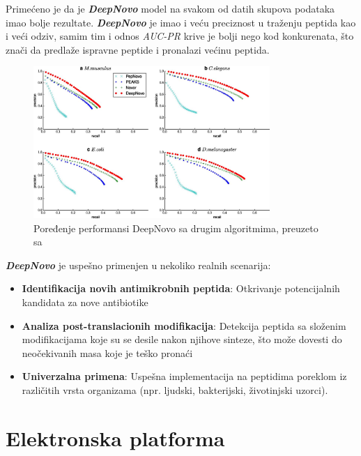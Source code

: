 \documentclass[12pt,oneside]{memoir}
\begin{document}
Primećeno je da je \textbf{\emph{DeepNovo}} model na svakom od datih skupova podataka imao bolje rezultate. \textbf{\emph{DeepNovo}} je imao i veću preciznost u traženju peptida kao i veći odziv, samim tim i odnos \emph{AUC-PR} krive je bolji nego kod konkurenata, što znači da predlaže ispravne peptide i pronalazi većinu peptida.

\begin{figure}[h]
\centering
\includegraphics[width=0.8\textwidth]{images/deep_novo_comparison.jpeg}
\caption{Poređenje performansi DeepNovo sa drugim algoritmima, preuzeto sa \cite{deepnovo}}
\label{fig:performanse}
\end{figure}

\textbf{\emph{DeepNovo}} je uspešno primenjen u nekoliko realnih scenarija:

\begin{itemize}
\item \textbf{Identifikacija novih antimikrobnih peptida}: Otkrivanje potencijalnih kandidata za nove antibiotike
\item \textbf{Analiza post-translacionih modifikacija}: Detekcija peptida sa složenim modifikacijama koje su se desile nakon njihove sinteze, što može dovesti do neočekivanih masa koje je teško pronaći
\item \textbf{Univerzalna primena}: Uspešna implementacija na peptidima poreklom iz različitih vrsta organizama (npr. ljudski, bakterijski, životinjski uzorci).
\end{itemize}


\chapter{Elektronska platforma}
\end{document}
